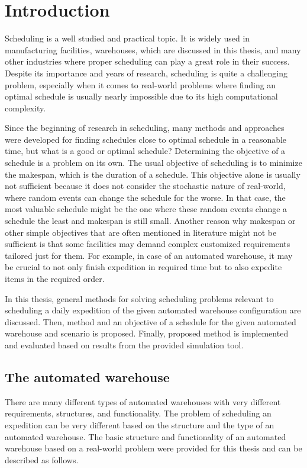 \documentclass{ctuthesis}
\begin{document}
\maketitle

\chapter{Introduction}

Scheduling is a well studied and practical topic. It is widely used in manufacturing facilities, warehouses, which are discussed in this thesis, and many other industries where proper scheduling can play a great role in their success. Despite its importance and years of research, scheduling is quite a challenging problem, especially when it comes to real-world problems where finding an optimal schedule is usually nearly impossible due to its high computational complexity. 

Since the beginning of research in scheduling, many methods and approaches were developed for finding schedules close to optimal schedule in a reasonable time, but what is a good or optimal schedule? Determining the objective of a schedule is a problem on its own. The usual objective of scheduling is to minimize the makespan, which is the duration of a schedule. This objective alone is usually not sufficient because it does not consider the stochastic nature of real-world, where random events can change the schedule for the worse. In that case, the most valuable schedule might be the one where these random events change a schedule the least and makespan is still small. Another reason why makespan or other simple objectives that are often mentioned in literature might not be sufficient is that some facilities may demand complex customized requirements tailored just for them. For example, in case of an automated warehouse, it may be crucial to not only finish expedition in required time but to also expedite items in the required order. 

In this thesis, general methods for solving scheduling problems relevant to scheduling a daily expedition of the given automated warehouse configuration are discussed. Then, method and an objective of a schedule for the given automated warehouse and scenario is proposed. Finally, proposed method is implemented and evaluated based on results from the provided simulation tool. 

\section{The automated warehouse}
\label{sec:wh}
There are many different types of automated warehouses with very different requirements, structures, and functionality. The problem of scheduling an expedition can be very different based on the structure and the type of an automated warehouse. The basic structure and functionality of an automated warehouse based on a real-world problem were provided for this thesis and can be described as follows.
\end{document}
